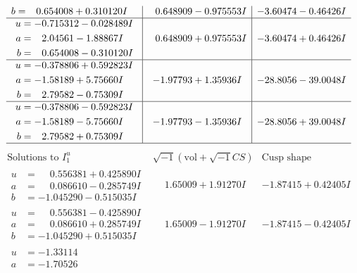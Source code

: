 \documentclass[1p]{elsarticle_modified}
\theoremstyle{definition}
\newcommand{\I}{\sqrt{-1}}
\begin{document}
$$\begin{array}{c|c|c}
\begin{aligned}
b &= \phantom{-}0.654008 + 0.310120 I\end{aligned}
 & \phantom{-}0.648909 - 0.975553 I & -3.60474 - 0.46426 I \\ \hline\begin{aligned}
u &= -0.715312 - 0.028489 I \\
a &= \phantom{-}2.04561 - 1.88867 I \\
b &= \phantom{-}0.654008 - 0.310120 I\end{aligned}
 & \phantom{-}0.648909 + 0.975553 I & -3.60474 + 0.46426 I \\ \hline\begin{aligned}
u &= -0.378806 + 0.592823 I \\
a &= -1.58189 + 5.75660 I \\
b &= \phantom{-}2.79582 - 0.75309 I\end{aligned}
 & -1.97793 + 1.35936 I & -28.8056 - 39.0048 I \\ \hline\begin{aligned}
u &= -0.378806 - 0.592823 I \\
a &= -1.58189 - 5.75660 I \\
b &= \phantom{-}2.79582 + 0.75309 I\end{aligned}
 & -1.97793 - 1.35936 I & -28.8056 + 39.0048 I\\
 \hline 
 \end{array}$$\newpage$$\begin{array}{c|c|c}  
\text{Solutions to }I^u_{1}& \I (\text{vol} + \sqrt{-1}CS) & \text{Cusp shape}\\
 \hline 
\begin{aligned}
u &= \phantom{-}0.556381 + 0.425890 I \\
a &= \phantom{-}0.086610 - 0.285749 I \\
b &= -1.045290 - 0.515035 I\end{aligned}
 & \phantom{-}1.65009 + 1.91270 I & -1.87415 + 0.42405 I \\ \hline\begin{aligned}
u &= \phantom{-}0.556381 - 0.425890 I \\
a &= \phantom{-}0.086610 + 0.285749 I \\
b &= -1.045290 + 0.515035 I\end{aligned}
 & \phantom{-}1.65009 - 1.91270 I & -1.87415 - 0.42405 I \\ \hline\begin{aligned}
u &= -1.33114\phantom{ +0.000000I} \\
a &= -1.70526\phantom{ +0.000000I} \\

\end{aligned}
\end{array}$$
\end{document}
